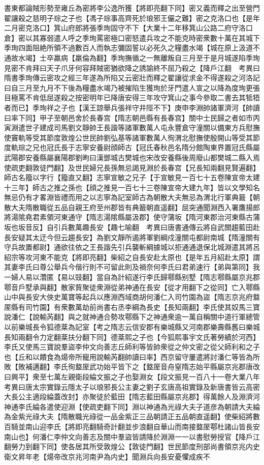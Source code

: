 書東都論賊形勢至雍丘為密將李公逸所獲【將即亮翻下同】密又義而釋之出至營門翟讓殺之慈明子琮之子也【馮子琮事高齊死於琅邪王儼之難】密之克洛口也【是年二月密克洛口】箕山府郎將張季珣固守不下【大業十二年移箕山公路二府守洛口倉】密以其寡弱遣人呼之季珣罵密極口密怒遣兵攻之不能克時密衆數十萬在其城下季珣四面阻絶所領不過數百人而執志彌固誓以必死久之糧盡水竭【城在原上汲道不通故水竭】士卒羸病【羸倫為翻】季珣撫循之一無離叛自三月至于是月城遂陷季珣見密不肯拜曰天子爪牙何容拜賊密猶欲降之誘諭終不屈乃殺之【降戶江翻　考異曰隋書季珣傳云密攻之經三年遂為所陷又云密壯而釋之翟讓從求金不得遂殺之河洛記曰自三月至九月不下後為糧盡水竭乃被摧陷生獲珣於牙門遣人宣之以降為度珣更張目極罵不肯低屈遂殺之按密明年已降唐安得三年攻守箕山之事今參取二書去其牴牾者而已】季珣祥之子也【漢王諒舉兵張祥守井陘不下】庚申李淵帥諸軍濟河【帥讀曰率下同】甲子至朝邑舍於長春宫【隋志朝邑縣有長春宫】關中士民歸之者如市丙寅淵遣世子建成司馬劉文靜帥王長諧等諸軍數萬人屯永豐倉守潼關以備東方兵慰撫使竇軌等受其節度敦煌公世民帥劉弘基等諸軍數萬人徇渭北慰撫使殷開山等受其節度軌琮之兄也冠氏長于志寧安養尉顔師古【冠氏春秋邑名隋分館陶東界置冠氏縣屬武陽郡安養縣屬襄陽郡劉昫曰漢鄧城古樊城也宋改安養縣後周廢山都樊城二縣入焉使疏吏翻敦徒門翻】及世民婦兄長孫無忌謁見淵於長春宫【兄長知兩翻見賢遍翻】師古名籀以字行【籀直又翻】志寧宣敏之兄子【于宣敏見一百七十五卷陳宣帝太建十三年】師古之推之孫也【顔之推見一百七十三卷陳宣帝大建九年】皆以文學知名無忌仍有才畧淵皆禮而用之以志寧為記室師古為朝散大夫無忌為渭北行軍典籖【朝散大夫隋散職從五品自親王府至州郡皆有典籖朝直遥翻】屈突通聞淵西入署鷹揚郎將湯隂堯君素領河東通守【隋志湯隂縣屬汲郡】使守蒲坂【隋河東郡治河東縣古蒲坂也坂音反】自引兵數萬趣長安【趣七喻翻　考異曰唐書通傳云將自武關趨藍田赴長安疑其太迂今但云趨長安】為劉文靜所遏將軍劉綱戍潼關屯都尉南城【隋潼關有守兵故置都尉】通欲往依之王長諧先引兵襲斬綱據城以拒通通退保北城淵遣其將呂紹宗等攻河東不能克【將即亮翻】柴紹之自長安赴太原也【是年五月紹赴太原】謂其妻李氏曰尊公舉兵今偕行則不可留此則及禍奈何李氏曰君弟速行【弟與第同】我一婦人易以濳匿【易以豉翻】當自為計紹遂行李氏歸鄠縣别墅【隋志鄠縣屬京兆郡鄠音戶墅承與翻】散家貲聚徒衆淵從弟神通在長安【從才用翻下之從同】亡入鄠縣山中與長安大俠史萬寶等起兵以應淵西域商胡何潘仁入司竹園為盜【隋志京兆府盩厔縣有司竹園】有衆數萬劫前尚書右丞李綱為長史【長知兩翻】李氏使其奴馬三寶說潘仁【說輸芮翻】與之就神通合勢攻鄠縣下之神通衆逾一萬自稱關中道行軍總管以前樂城長令狐德棻為記室【考之隋志云信安郡有樂城縣又河南郡樂壽縣舊曰樂城長知兩翻令力定翻棻扶分翻下同】德棻熙之子也【今狐熙事宇文氏著勞績於河西】李氏又使馬三寶說羣盜李仲文向善志丘師利等皆帥衆從之仲文密之從父師利和之子也【丘和以饋食為煬帝所寵用說輸芮翻帥讀曰率】西京留守屢遣將討潘仁等皆為所敗【敗補邁翻】李氏徇盩厔武功始平皆下之【盩厔音舟窒隋志始平縣屬京兆郡唐改曰興平】衆至七萬左親衛段綸文振之子也娶淵女【段文振見一百八十一卷大業八年　考異曰唐太宗實錄云隱太子以琅邪長公主妻之劉子玄唐高祖實錄及新唐書皆云高密大長公主適段綸蓋改封】亦聚徒於藍田【隋志藍田縣屬京兆郡】得萬餘人及淵濟河神通李氏綸各遣使迎淵【使疏吏翻下同】淵以神通為光祿大夫子道彦為朝請大夫綸為金紫光祿大夫【隋散職光祿從一品金紫正三品朝請正五品朝直遥翻】使柴紹將數百騎並南山迎李氏【將即亮翻騎奇計翻並步浪翻自華山而南接盩厔鄠杜諸山皆長安南山也】何潘仁李仲文向善志及關中羣盜皆請降於淵淵一一以書慰勞授官【降戶江翻勞力到翻下同】使各居其所受敦煌公【敦徒門翻】世民節度刑部尚書領京兆内史衛文昇年老【煬帝改京兆河南尹為内史】聞淵兵向長安憂懼成疾不